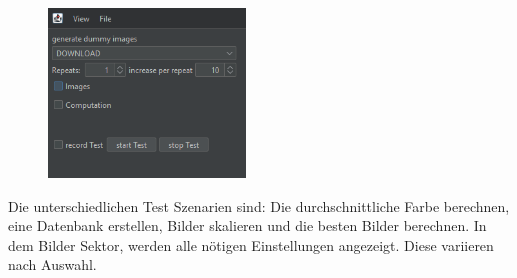 \begin{figure}[h]
    \centering
    \includegraphics[height=4.5cm]{images/Bedienungsanleitung/test Mode UI.png}
    \label{Testbereich}
\end{figure}

Die unterschiedlichen Test Szenarien sind: Die durchschnittliche Farbe berechnen, eine Datenbank erstellen, Bilder skalieren und die besten Bilder berechnen. In dem Bilder Sektor, werden alle nötigen Einstellungen angezeigt. Diese variieren nach Auswahl.

\begin{figure}[h]
    \centering
    \label{Einstellungen}
\end{figure}

